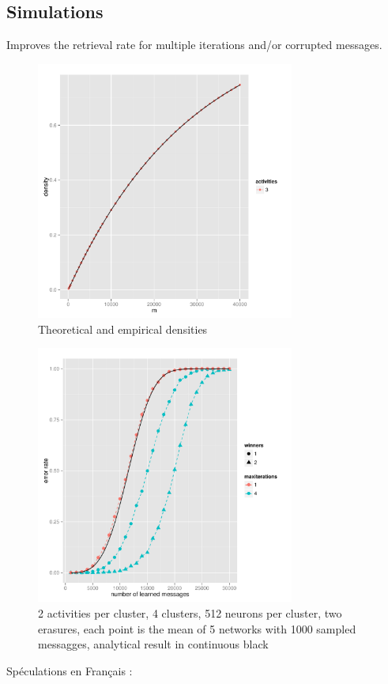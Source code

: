 \documentclass[english,11pt,twocolumn]{article}
\theoremstyle{definition}
\begin{document}
	\subsection{Simulations}
		Improves the retrieval rate for multiple iterations and/or corrupted messages.
	\begin{figure}
		\includegraphics[width=8.5cm]{densiteexemple.pdf}
		\caption{Theoretical and empirical densities}
	\end{figure}
	
	\begin{figure}
		\includegraphics[width=8.5cm]{comparaison_regles_pool5_a2c4l512e2}
		\caption{2 activities per cluster, 4 clusters, 512 neurons per cluster, two erasures, each point is the mean of 5 networks with 1000 sampled messagges, analytical result in continuous black}
		\end{figure}	
		
		
	\newpage
	Spéculations en Français :
	
\end{document}

